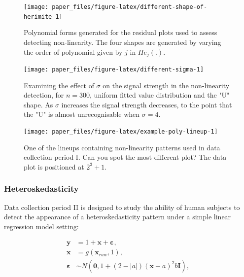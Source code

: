 \documentclass[]{interact}
\theoremstyle{plain}%
\theoremstyle{definition}
\theoremstyle{remark}
\begin{document}
\begin{figure}

{\centering \texttt{[image: paper\_files/figure-latex/different-shape-of-herimite-1]} 

}

\caption{Polynomial forms generated for the residual plots used to assess detecting non-linearity. The four shapes are generated by varying the order of polynomial given by $j$ in $He_j(.)$.}\label{fig:different-shape-of-herimite}
\end{figure}

\begin{figure}

{\centering \texttt{[image: paper\_files/figure-latex/different-sigma-1]} 

}

\caption{Examining the effect of $\sigma$ on the signal strength in the non-linearity detection, for $n=300$, uniform fitted value distribution and the "U" shape. As $\sigma$ increases the signal strength decreases, to the point that the "U" is almost unrecognisable when $\sigma=4$.}\label{fig:different-sigma}
\end{figure}

\begin{figure}

{\centering \texttt{[image: paper\_files/figure-latex/example-poly-lineup-1]} 

}

\caption{One of the lineups containing non-linearity patterns used in data collection period I. Can you spot the most different plot? The data plot is positioned at $2^3 + 1$.}\label{fig:example-poly-lineup}
\end{figure}

\hypertarget{heteroskedasticity}{%
\subsubsection{Heteroskedasticity}\label{heteroskedasticity}}

Data collection period II is designed to study the ability of human
subjects to detect the appearance of a heteroskedasticity pattern under
a simple linear regression model setting:

\begin{align} \label{eq:heter-model}
\boldsymbol{y} &= 1 + \boldsymbol{x} + \boldsymbol{\varepsilon},\\
\boldsymbol{x} &= g(\boldsymbol{x}_{raw}, 1),\\
\boldsymbol{\varepsilon} &\sim N(\boldsymbol{0}, 1 + (2 - |a|)(\boldsymbol{x} - a)^2b \boldsymbol{I}), 
\end{align}
\end{document}
